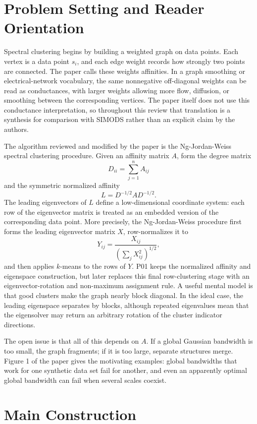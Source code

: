 \documentclass[11pt]{article}
\begin{document}
\section{Problem Setting and Reader Orientation}

Spectral clustering begins by building a weighted graph on data points. Each
vertex is a data point \(s_i\), and each edge weight records how strongly two
points are connected. The paper calls these weights affinities. In a graph
smoothing or electrical-network vocabulary, the same nonnegative off-diagonal
weights can be read as conductances, with larger weights allowing more flow,
diffusion, or smoothing between the corresponding vertices. The paper itself
does not use this conductance interpretation, so throughout this review that
translation is a synthesis for comparison with SIMODS rather than an explicit
claim by the authors.

The algorithm reviewed and modified by the paper is the Ng-Jordan-Weiss
spectral clustering procedure. Given an affinity matrix \(A\), form the degree
matrix
\[
  D_{ii}=\sum_{j=1}^n A_{ij}
\]
and the symmetric normalized affinity
\[
  L = D^{-1/2} A D^{-1/2}.
\]
The leading eigenvectors of \(L\) define a low-dimensional coordinate system:
each row of the eigenvector matrix is treated as an embedded version of the
corresponding data point. More precisely, the Ng-Jordan-Weiss procedure first
forms the leading eigenvector matrix \(X\), row-normalizes it to
\[
  Y_{ij} = \frac{X_{ij}}{\left(\sum_j X_{ij}^2\right)^{1/2}},
\]
and then applies \(k\)-means to the rows of \(Y\). P01 keeps the normalized
affinity and eigenspace construction, but later replaces this final
row-clustering stage with an eigenvector-rotation and non-maximum assignment
rule. A useful mental model is that good clusters make the graph nearly block
diagonal. In the ideal
case, the leading eigenspace separates by blocks, although repeated eigenvalues
mean that the eigensolver may return an arbitrary rotation of the cluster
indicator directions.

The open issue is that all of this depends on \(A\). If a global Gaussian
bandwidth is too small, the graph fragments; if it is too large, separate
structures merge. Figure 1 of the paper gives the motivating examples: global
bandwidths that work for one synthetic data set fail for another, and even an
apparently optimal global bandwidth can fail when several scales coexist.

\section{Main Construction}
\end{document}
